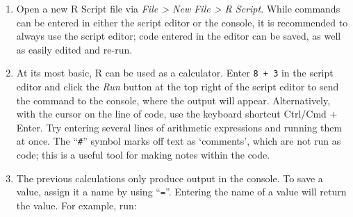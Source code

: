 \documentclass[letterpaper,12pt,twoside,]{pinp}
\begin{document}
\begin{enumerate}
\def\labelenumi{\arabic{enumi}.}
\item
  Open a new R Script file via \emph{File \textgreater{} New File
  \textgreater{} R Script}. While commands can be entered in either the
  script editor or the console, it is recommended to always use the
  script editor; code entered in the editor can be saved, as well as
  easily edited and re-run.
\item
  At its most basic, \textsf{R} can be used as a calculator. Enter
  \texttt{8 + 3} in the script editor and click the \emph{Run} button at
  the top right of the script editor to send the command to the console,
  where the output will appear. Alternatively, with the cursor on the
  line of code, use the keyboard shortcut Ctrl/Cmd + Enter. Try entering
  several lines of arithmetic expressions and running them at once. The
  ``\texttt{\#}'' symbol marks off text as `comments', which are not run
  as code; this is a useful tool for making notes within the code.

\begin{Shaded}
\begin{Highlighting}[]
 \OperatorTok{+}\StringTok{ }
\NormalTok{(}\NormalTok{)}
\NormalTok{((}\OperatorTok{/}\NormalTok{) }\OperatorTok{*}\StringTok{ }\NormalTok{(}\OperatorTok{^}\NormalTok{))}\OperatorTok{/}
\end{Highlighting}
\end{Shaded}
\item
  The previous calculations only produce output in the console. To save
  a value, assign it a name by using ``\texttt{=}''. Entering the name
  of a value will return the value. For example, run:

\begin{Shaded}
\begin{Highlighting}[]
\StringTok{ } \OperatorTok{+}\StringTok{ }
\StringTok{ }\NormalTok{(}\NormalTok{)}

\OperatorTok{+}\StringTok{ }


\end{Highlighting}
\end{Shaded}
\end{enumerate}
\end{document}
